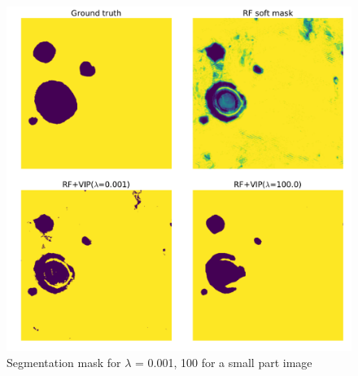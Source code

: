 \begin{figure}[h!] \label{fig:effect}
\centering
 \includegraphics[width=0.8\linewidth]{figures/lamda_effect.pdf}
\caption{Segmentation mask for $\lambda$ = 0.001, 100 for a small part image}
\end{figure}


